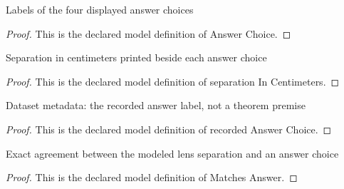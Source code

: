 \begin{definition}
  \label{def:physics:phyx-mini-0112:phyxminiproblems-problemphyxmini0112-answerchoice}
  Labels of the four displayed answer choices
\end{definition}
\begin{proof}
  This is the declared model definition of Answer Choice.
\end{proof}
\begin{definition}
  \label{def:physics:phyx-mini-0112:phyxminiproblems-problemphyxmini0112-answerchoice-separationincentimeters}
  Separation in centimeters printed beside each answer choice
\end{definition}
\begin{proof}
  This is the declared model definition of separation In Centimeters.
\end{proof}
\begin{definition}
  \label{def:physics:phyx-mini-0112:phyxminiproblems-problemphyxmini0112-recordedanswerchoice}
  Dataset metadata: the recorded answer label, not a theorem premise
\end{definition}
\begin{proof}
  This is the declared model definition of recorded Answer Choice.
\end{proof}
\begin{definition}
  \label{def:physics:phyx-mini-0112:phyxminiproblems-problemphyxmini0112-matchesanswer}
  Exact agreement between the modeled lens separation and an answer choice
\end{definition}
\begin{proof}
  This is the declared model definition of Matches Answer.
\end{proof}
